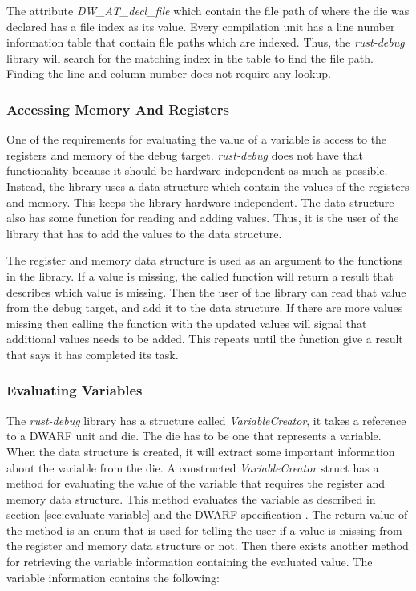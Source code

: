 The attribute  \emph{DW\_AT\_decl\_file} which contain the file path of where the \gls{die} was declared has a file index as its value.
Every compilation unit has a line number information table that contain file paths which are indexed.
Thus, the \emph{rust-debug} library will search for the matching index in the table to find the file path.
Finding the line and column number does not require any lookup.


\subsubsection{Accessing Memory And Registers}
One of the requirements for evaluating the value of a variable is access to the registers and memory of the debug target.
\emph{rust-debug} does not have that functionality because it should be hardware independent as much as possible.
Instead, the library uses a data structure which contain the values of the registers and memory.
This keeps the library hardware independent.
The data structure also has some function for reading and adding values.
Thus, it is the user of the library that has to add the values to the data structure.


The register and memory data structure is used as an argument to the functions in the library.
If a value is missing, the called function will return a result that describes which value is missing.
Then the user of the library can read that value from the debug target, and add it to the data structure.
If there are more values missing then calling the function with the updated values will signal that additional values needs to be added.
This repeats until the function give a result that says it has completed its task.


\subsubsection{Evaluating Variables} \label{sec:ievalvar}
The \emph{rust-debug} library has a structure called \emph{VariableCreator}, it takes a reference to a \gls{DWARF} unit and \gls{die}.
The \gls{die} has to be one that represents a variable.
When the data structure is created, it will extract some important information about the variable from the \gls{die}. A constructed \emph{VariableCreator} struct has a method for evaluating the value of the variable that requires the register and memory data structure.
This method evaluates the variable as described in section \ref{sec:evaluate-variable} and the \gls{DWARF} specification \cite{dwarf}.
The return value of the method is an enum that is used for telling the user if a value is missing from the register and memory data structure or not.
Then there exists another method for retrieving the variable information containing the evaluated value.
The variable information contains the following:

